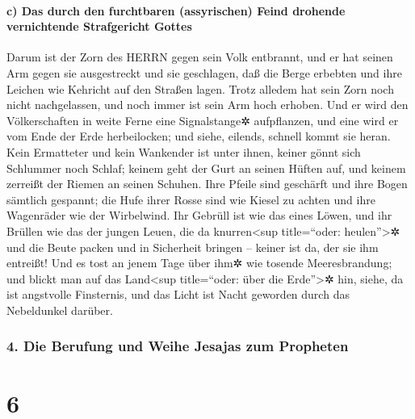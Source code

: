\hypertarget{c-das-durch-den-furchtbaren-assyrischen-feind-drohende-vernichtende-strafgericht-gottes}{%
\paragraph{c) Das durch den furchtbaren (assyrischen) Feind drohende
vernichtende Strafgericht
Gottes}\label{c-das-durch-den-furchtbaren-assyrischen-feind-drohende-vernichtende-strafgericht-gottes}}

Darum ist der Zorn des HERRN gegen sein Volk entbrannt,
und er hat seinen Arm gegen sie ausgestreckt und sie geschlagen, daß die
Berge erbebten und ihre Leichen wie Kehricht auf den Straßen lagen.
Trotz alledem hat sein Zorn noch nicht nachgelassen, und noch immer ist
sein Arm hoch erhoben. Und er wird den Völkerschaften in
weite Ferne eine Signalstange✲ aufpflanzen, und eine wird er vom Ende
der Erde herbeilocken; und siehe, eilends, schnell kommt sie heran.
Kein Ermatteter und kein Wankender ist unter ihnen,
keiner gönnt sich Schlummer noch Schlaf; keinem geht der Gurt an seinen
Hüften auf, und keinem zerreißt der Riemen an seinen Schuhen.
Ihre Pfeile sind geschärft und ihre Bogen sämtlich
gespannt; die Hufe ihrer Rosse sind wie Kiesel zu achten und ihre
Wagenräder wie der Wirbelwind. Ihr Gebrüll ist wie das
eines Löwen, und ihr Brüllen wie das der jungen Leuen, die da
knurren\textless sup title=``oder: heulen''\textgreater✲ und die Beute
packen und in Sicherheit bringen -- keiner ist da, der sie ihm entreißt!
Und es tost an jenem Tage über ihm✲ wie tosende
Meeresbrandung; und blickt man auf das Land\textless sup title=``oder:
über die Erde''\textgreater✲ hin, siehe, da ist angstvolle Finsternis,
und das Licht ist Nacht geworden durch das Nebeldunkel darüber.

\hypertarget{die-berufung-und-weihe-jesajas-zum-propheten}{%
\subsubsection{4. Die Berufung und Weihe Jesajas zum
Propheten}\label{die-berufung-und-weihe-jesajas-zum-propheten}}

\hypertarget{section-5}{%
\section{6}\label{section-5}}


